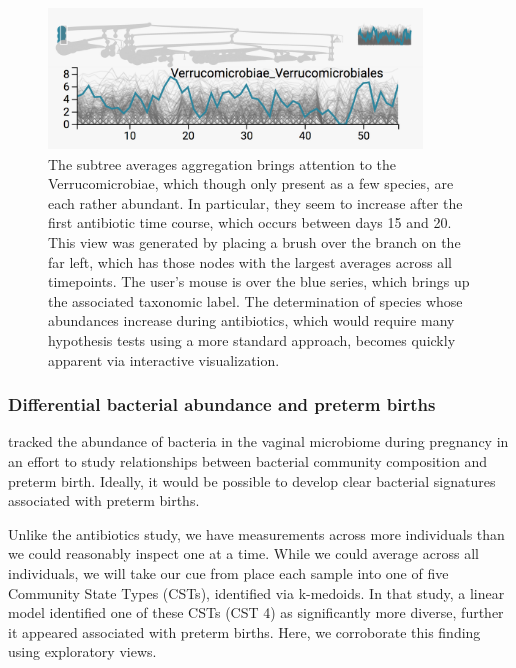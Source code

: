 \begin{figure}

{\centering \includegraphics[width=375px]{figure/treelapse/verrucomicrobiae}

}

\caption{The subtree averages aggregation brings attention to the
  Verrucomicrobiae, which though only present as a few species, are each rather
  abundant. In particular, they seem to increase after the first antibiotic time
  course, which occurs between days 15 and 20. This view was generated by
  placing a brush over the branch on the far left, which has those nodes with
  the largest averages across all timepoints. The user's mouse is over the blue
  series, which brings up the associated taxonomic label. The determination of
  species whose abundances increase during antibiotics, which would require many
  hypothesis tests using a more standard approach, becomes quickly apparent
  via interactive visualization.}\label{fig:verrucomicrobiae}
\end{figure}

\subsubsection{Differential bacterial abundance and preterm
births}\label{differential-bacterial-abundance-and-preterm-births}

\citet{digiulio2015temporal}
tracked the abundance of bacteria in the vaginal microbiome during
pregnancy in an effort to study relationships between bacterial
community composition and preterm birth. Ideally, it would be possible
to develop clear bacterial signatures associated with preterm births.

Unlike the antibiotics study, we have measurements across more
individuals than we could reasonably inspect one at a time. While we
could average across all individuals, we will take our cue from
\citep{digiulio2015temporal}
place each sample into one of five Community State Types (CSTs),
identified via k-medoids. In that study, a linear model identified one
of these CSTs (CST 4) as significantly more diverse, further it appeared
associated with preterm births. Here, we corroborate this finding using
exploratory views.


